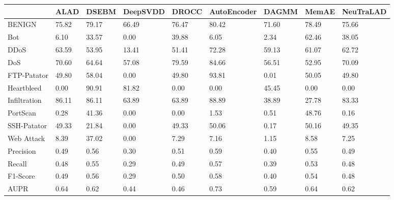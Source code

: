 \begin{tabular}{lllllllll}
\toprule
{} &   ALAD &  DSEBM & DeepSVDD &  DROCC & AutoEncoder &  DAGMM &  MemAE & NeuTraLAD \\
\midrule
BENIGN       &  75.82 &  79.17 &    66.49 &  76.47 &       80.42 &  71.60 &  78.49 &     75.66 \\
Bot          &   6.10 &  33.57 &     0.00 &  39.88 &        6.05 &   2.34 &  62.46 &     38.05 \\
DDoS         &  63.59 &  53.95 &    13.41 &  51.41 &       72.28 &  59.13 &  61.07 &     62.72 \\
DoS          &  70.60 &  64.64 &    57.08 &  79.59 &       84.66 &  56.51 &  52.95 &     70.09 \\
FTP-Patator  &  49.80 &  58.04 &     0.00 &  49.80 &       93.81 &   0.01 &  50.05 &     49.80 \\
Heartbleed   &   0.00 &  90.91 &    81.82 &   0.00 &        0.00 &  45.45 &   0.00 &      0.00 \\
Infiltration &  86.11 &  86.11 &    63.89 &  63.89 &       88.89 &  38.89 &  27.78 &     83.33 \\
PortScan     &   0.28 &  41.36 &     0.00 &   0.00 &        1.53 &   0.51 &  48.76 &      0.16 \\
SSH-Patator  &  49.33 &  21.84 &     0.00 &  49.33 &       50.06 &   0.17 &  50.16 &     49.35 \\
Web Attack   &   8.39 &  37.02 &     0.00 &   7.29 &        7.16 &   1.15 &   8.58 &      7.25 \\
Precision    &   0.49 &   0.56 &     0.30 &   0.51 &        0.59 &   0.40 &   0.55 &      0.49 \\
Recall       &   0.48 &   0.55 &     0.29 &   0.49 &        0.57 &   0.39 &   0.53 &      0.48 \\
F1-Score     &   0.49 &   0.56 &     0.29 &   0.50 &        0.58 &   0.40 &   0.54 &      0.48 \\
AUPR         &   0.64 &   0.62 &     0.44 &   0.46 &        0.73 &   0.59 &   0.64 &      0.62 \\
\bottomrule
\end{tabular}
